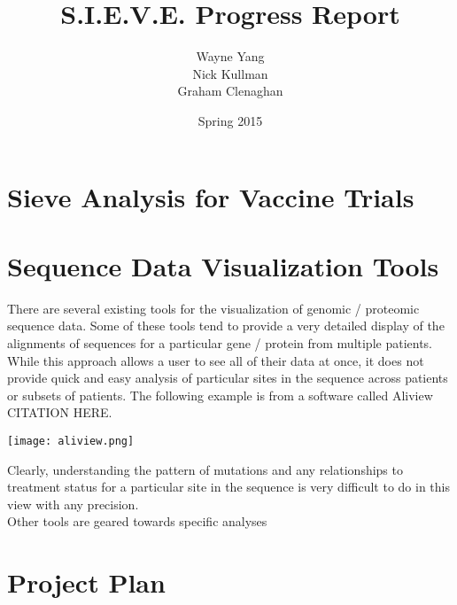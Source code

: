 \documentclass{article}
\begin{document}
\title{S.I.E.V.E. Progress Report}
\author{Wayne Yang \\ Nick Kullman \\ Graham Clenaghan}
\date{Spring 2015}
\maketitle

\section{Sieve Analysis for Vaccine Trials}


\section{Sequence Data Visualization Tools}

There are several existing tools for the visualization of genomic / proteomic sequence data.  Some of these tools tend to provide a very detailed display of the alignments of sequences for a particular gene / protein from multiple patients.  While this approach allows a user to see all of their data at once, it does not provide quick and easy analysis of particular sites in the sequence across patients or subsets of patients.  The following example is from a software called Aliview CITATION HERE.

\begin{center}
\texttt{[image: aliview.png]}
\end{center}
Clearly, understanding the pattern of mutations and any relationships to treatment status for a particular site in the sequence is very difficult to do in this view with any precision.
\\
\newline
\noindent Other tools are geared towards specific analyses

\section{Project Plan}
\end{document}
